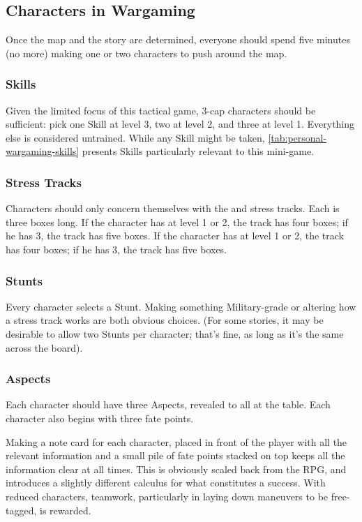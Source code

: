 \subsection{Characters in Wargaming}
\label{sec:characters-in-wargaming}



Once the map and the story are determined, everyone should spend five minutes (no more) making one or two characters to push around the map.

\subsubsection{Skills}

Given the limited focus of this tactical game, 3-cap characters should be sufficient: pick one Skill at level 3, two at level 2, and three at level 1. Everything else is considered untrained. While any Skill might be taken, \autoref{tab:personal-wargaming-skills} presents Skills particularly relevant to this mini-game.

\subsubsection{Stress Tracks}

Characters should only concern themselves with the \Health{} and \Composure{} stress tracks. Each is three boxes long. If the character has  at level 1 or 2, the \Composure{} track has four boxes; if he has  3, the \Composure{} track has five boxes. If the character has  at level 1 or 2, the \Health{} track has four boxes; if he has  3, the \Health{} track has five boxes.

\subsubsection{Stunts}

Every character selects a Stunt. Making something Military-grade or altering how a stress track works are both obvious choices. (For some stories, it may be desirable to allow two Stunts per character; that's fine, as long as it's the same across the board).

\subsubsection{Aspects}

Each character should have three Aspects, revealed to all at the table. Each character also begins with three fate points.

Making a note card for each character, placed in front of the player with all the relevant information and a small pile of fate points stacked on top keeps all the information clear at all times. This is obviously scaled back from the RPG, and introduces a slightly different calculus for what constitutes a success. With reduced characters, teamwork, particularly in laying down maneuvers to be free-tagged, is rewarded.
